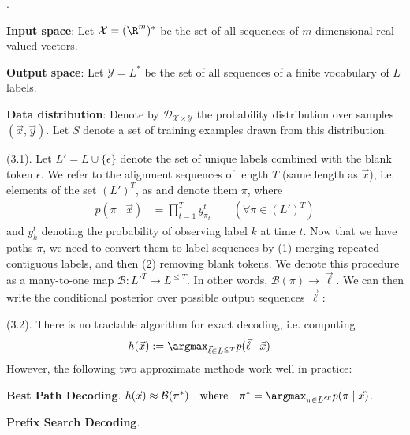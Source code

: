 \documentclass[11pt]{article}
\begin{document}
\p {}.

\begin{compactitem}
	\item \textbf{Input space}: Let $\mathcal X = (\R^m)^*$ be the set of all sequences of $m$ dimensional real-valued vectors. 
	
	\item \textbf{Output space}: Let $\mathcal{Y} = L^*$ be the set of all sequences of a finite vocabulary of $L$ labels. 
	
	\item \textbf{Data distribution}: Denote by $\mathcal{D}_{\mathcal X \times \mathcal Y}$ the probability distribution over samples $(\vec x, \vec y)$. Let $S$ denote a set of training examples drawn from this distribution. 
\end{compactitem}

\myspace
\p {} (3.1). Let $L' = L \cup \{ \epsilon \}$ denote the set of unique labels combined with the blank token $\epsilon$. We refer to the alignment sequences of length $T$ (same length as $\vec x$), i.e. elements of the set $(L')^T$, as  and denote them $\pi$, where
\begin{align}
p(\pi \mid \vec x)
&= \prod_{t=1}^{T} y_{\pi_t}^t \qquad (\forall \pi \in (L')^T)
\end{align}
and $y_k^t$ denoting the probability of observing label $k$ at time $t$. Now that we have paths $\pi$, we need to convert them to label sequences by (1) merging repeated contiguous labels, and then (2) removing blank tokens. We denote this procedure as a many-to-one map $\mathcal{B} : L'^T \mapsto L^{\le T}$. In other words, $\mathcal B (\pi) \rightarrow \vec\ell$. We can then write the conditional posterior over possible output sequences $\vec\ell$:


\myspace
\p {} (3.2). There is no tractable algorithm for exact decoding, i.e. computing
\begin{align}
h(\vec x) 
&:= \argmax_{\vec\ell \in L^{\le T}} p(\vec\ell \mid \vec x)
\end{align}
However, the following two approximate methods work well in practice:
\begin{compactenum}
	\item \textbf{Best Path Decoding}. $ h(\vec x) \approx \mathcal{B}(\pi^*) \quad \text{where} \quad \pi^* = \argmax_{\pi \in L'^T} p(\pi \mid \vec x)$. 
	
	\item \textbf{Prefix Search Decoding}.
\end{compactenum}
\end{document}
